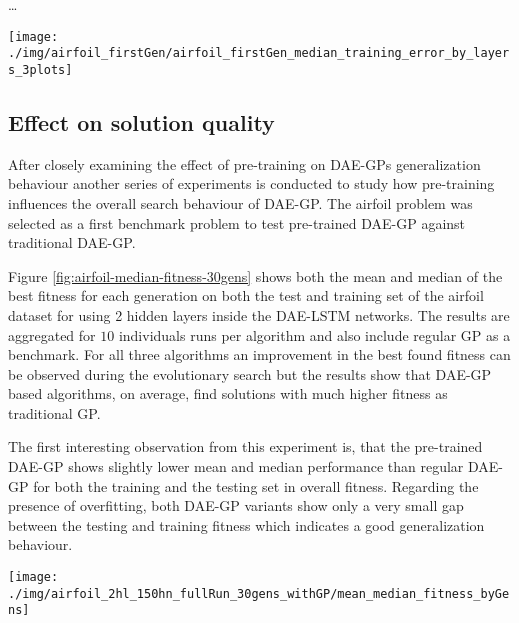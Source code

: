 \documentclass[
  11pt,
]{article}
\let\origfigure\figure
\let\endorigfigure\endfigure
\renewenvironment{figure}[1][2] {
    \expandafter\origfigure\expandafter[H]
} {
    \endorigfigure
}
\begin{document}
\ldots{}

\begin{figure}[c]

{\centering \texttt{[image: ./img/airfoil\_firstGen/airfoil\_firstGen\_median\_training\_error\_by\_layers\_3plots]} 

}

\caption{First Generation Median Training Error for variable number of hidden Layers}\label{fig:first-gen-airfoil-byLayers}
\end{figure}

\hypertarget{effect-on-solution-quality}{%
\subsection{Effect on solution quality}\label{effect-on-solution-quality}}

After closely examining the effect of pre-training on DAE-GPs generalization behaviour another series of experiments is conducted to study how pre-training influences the overall search behaviour of DAE-GP. The airfoil problem was selected as a first benchmark problem to test pre-trained DAE-GP against traditional DAE-GP.

Figure \ref{fig:airfoil-median-fitness-30gens} shows both the mean and median of the best fitness for each generation on both the test and training set of the airfoil dataset for using 2 hidden layers inside the DAE-LSTM networks. The results are aggregated for \(10\) individuals runs per algorithm and also include regular GP as a benchmark. For all three algorithms an improvement in the best found fitness can be observed during the evolutionary search but the results show that DAE-GP based algorithms, on average, find solutions with much higher fitness as traditional GP.

The first interesting observation from this experiment is, that the pre-trained DAE-GP shows slightly lower mean and median performance than regular DAE-GP for both the training and the testing set in overall fitness. Regarding the presence of overfitting, both DAE-GP variants show only a very small gap between the testing and training fitness which indicates a good generalization behaviour.

\begin{figure}[c]

{\centering \texttt{[image: ./img/airfoil\_2hl\_150hn\_fullRun\_30gens\_withGP/mean\_median\_fitness\_byGens]} 

}

\caption{Best Fitness over 30 Generations - Airfoil (2HL)}\label{fig:airfoil-median-fitness-30gens}
\end{figure}
\end{document}
